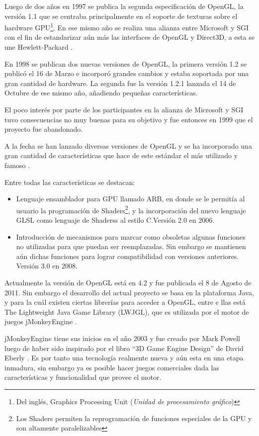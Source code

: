 \documentclass[a4paper,12pt,openany,oneside]{book}
\begin{document}
Luego de dos años en 1997 se publica la segunda especificación de OpenGL, la versión 1.1 que se centraba principalmente en el soporte de texturas sobre el hardware GPU\footnote{Del inglés, Graphics Processing Unit (\textit{Unidad de procesamiento gráfico})}. En ese mismo año se realiza una alianza entre Microsoft y SGI con el fin de estandarizar aún más las interfaces de OpenGL y Direct3D, a esta se une Hewlett-Packard \cite{WIKIOGL}.

En 1998 se publican dos nuevas versiones de OpenGL, la primera versión 1.2 se publicó el 16 de Marzo e incorporó grandes cambios y estaba soportada por una gran cantidad de hardware. La segunda fue la versión 1.2.1 lanzada el 14 de Octubre de ese mismo año, añadiendo pequeñas características. 

El poco interés por parte de los participantes en la alianza de Microsoft y SGI tuvo consecuencias no muy buenas para su objetivo y fue entonces en 1999 que el proyecto fue abandonado.

A la fecha se han lanzado diversas versiones de OpenGL y se ha incorporado una gran cantidad de características que hace de este estándar el más utilizado y famoso \cite{WIKIOGL}. 

Entre todas las características se destacan:
\begin{itemize}
\item Lenguaje ensamblador para GPU llamado ARB, en donde se le permitía al usuario la programación de Shaders\footnote{Los Shaders permiten la reprogramación de funciones especiales de la GPU y son altamente paralelizables}, y la incorporación del nuevo lenguaje GLSL como lenguaje de Shaderss al estilo C.Versión 2.0 en 2006. 
\item Introducción de mecanismos para marcar como obsoletas algunas funciones no utilizadas para que puedan ser reemplazadas. Sin embargo se mantienen aún dichas funciones para lograr compatibilidad con versiones anteriores. Versión 3.0 en 2008.
\end{itemize}
Actualmente la versión de OpenGL está en 4.2 y fue publicada el 8 de Agosto de 2011. Sin embargo el desarrollo del actual proyecto se basa en la plataforma Java, y para la cuál existen ciertas librerías para acceder a OpenGL, entre e llas está The Lightweight Java Game Library (LWJGL), que es utilizada por el motor de juegos jMonkeyEngine \cite{WIKIJME}.

jMonkeyEngine tiene sus inicios en el año 2003 y fue creado por Mark Powell luego de haber sido inspirado por el libro “3D Game Engine Design” de David Eberly \cite{EBERLY}. Es por tanto una tecnología realmente nueva y aún esta en una etapa inmadura, sin embargo ya es posible hacer juegos comerciales dada las características y funcionalidad que provee el motor.
\end{document}
